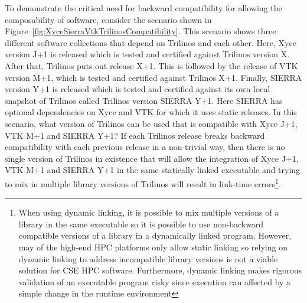 \documentclass[11pt]{SANDreport}
\begin{document}
To demonstrate the critical need for backward compatibility for
allowing the composability of software, consider the scenario shown in
Figure~\ref{fig:XyceSierraVtkTrilinosCompatibility}.  This scenario
shows three different software collections that depend on Trilinos and
each other.  Here, Xyce version J+1 is released which is tested and
certified against Trilinos version X.  After that, Trilinos puts out
release X+1.  This is followed by the release of VTK version M+1,
which is tested and certified against Trilinos X+1.  Finally, SIERRA
version Y+1 is released which is tested and certified against its own
local snapshot of Trilinos called Trilinos version SIERRA Y+1.  Here
SIERRA has optional dependencies on Xyce and VTK for which it uses
static releases.  In this scenario, what version of Trilinos can be
used that is compatible with Xyce J+1, VTK M+1 and SIERRA Y+1?  If
each Trilinos release breaks backward compatibility with each previous
release in a non-trivial way, then there is no single version of
Trilinos in existence that will allow the integration of Xyce J+1, VTK
M+1 and SIERRA Y+1 in the same statically linked executable and trying
to mix in multiple library versions of Trilinos will result in
link-time errors\footnote{When using dynamic linking, it is possible
to mix multiple versions of a library in the same executable so it is
possible to use non-backward compatible versions of a library in a
dynamically linked program.  However, may of the high-end HPC
platforms only allow static linking so relying on dynamic linking to
address incompatible library versions is not a viable solution for CSE
HPC software.  Furthermore, dynamic linking makes rigorous validation
of an executable program risky since execution can affected by a
simple change in the runtime environment}.
\end{document}
